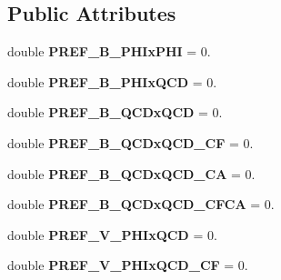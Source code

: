 \subsection*{Public Attributes}
\begin{DoxyCompactItemize}
\item 
\hypertarget{structAmplitudePrefactors_a940b1fc2d7789c9b6827c08890b58505}{double {\bfseries P\-R\-E\-F\-\_\-\-B\-\_\-\-P\-H\-Ix\-P\-H\-I} = 0.}\label{structAmplitudePrefactors_a940b1fc2d7789c9b6827c08890b58505}

\item 
\hypertarget{structAmplitudePrefactors_a2364b05d8c6008647d2d7b17ed9a64ef}{double {\bfseries P\-R\-E\-F\-\_\-\-B\-\_\-\-P\-H\-Ix\-Q\-C\-D} = 0.}\label{structAmplitudePrefactors_a2364b05d8c6008647d2d7b17ed9a64ef}

\item 
\hypertarget{structAmplitudePrefactors_a035afe555195dc9e1712eace6f92b0b0}{double {\bfseries P\-R\-E\-F\-\_\-\-B\-\_\-\-Q\-C\-Dx\-Q\-C\-D} = 0.}\label{structAmplitudePrefactors_a035afe555195dc9e1712eace6f92b0b0}

\item 
\hypertarget{structAmplitudePrefactors_af32002d54ac168e1ac1be1bed997ef6b}{double {\bfseries P\-R\-E\-F\-\_\-\-B\-\_\-\-Q\-C\-Dx\-Q\-C\-D\-\_\-\-C\-F} = 0.}\label{structAmplitudePrefactors_af32002d54ac168e1ac1be1bed997ef6b}

\item 
\hypertarget{structAmplitudePrefactors_a1bf88c2fd332ab76c3af857875fe8d07}{double {\bfseries P\-R\-E\-F\-\_\-\-B\-\_\-\-Q\-C\-Dx\-Q\-C\-D\-\_\-\-C\-A} = 0.}\label{structAmplitudePrefactors_a1bf88c2fd332ab76c3af857875fe8d07}

\item 
\hypertarget{structAmplitudePrefactors_a1b9290fdb263ecf6063c0dc75e7623be}{double {\bfseries P\-R\-E\-F\-\_\-\-B\-\_\-\-Q\-C\-Dx\-Q\-C\-D\-\_\-\-C\-F\-C\-A} = 0.}\label{structAmplitudePrefactors_a1b9290fdb263ecf6063c0dc75e7623be}

\item 
\hypertarget{structAmplitudePrefactors_a92eace16b4b1c4e3025896c80431be15}{double {\bfseries P\-R\-E\-F\-\_\-\-V\-\_\-\-P\-H\-Ix\-Q\-C\-D} = 0.}\label{structAmplitudePrefactors_a92eace16b4b1c4e3025896c80431be15}

\item 
\hypertarget{structAmplitudePrefactors_a0ce4f73dabd952d1c9ec7626413a0c54}{double {\bfseries P\-R\-E\-F\-\_\-\-V\-\_\-\-P\-H\-Ix\-Q\-C\-D\-\_\-\-C\-F} = 0.}\label{structAmplitudePrefactors_a0ce4f73dabd952d1c9ec7626413a0c54}


\end{DoxyCompactItemize}
